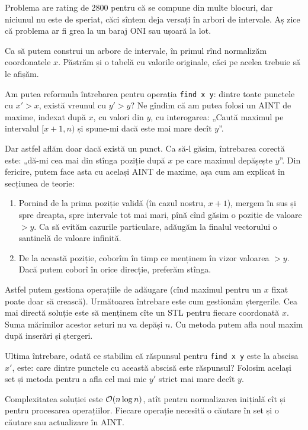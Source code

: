 \documentclass[../main.tex]{subfiles}
\begin{document}
Problema are rating de 2800 pentru că se compune din multe blocuri, dar niciunul nu este de speriat, căci sîntem deja versați în arbori de intervale.  Aș zice că problema ar fi grea la un baraj ONI sau ușoară la lot.

Ca să putem construi un arbore de intervale, în primul rînd normalizăm coordonatele $x$. Păstrăm și o tabelă cu valorile originale, căci pe acelea trebuie să le afișăm.

Am putea reformula întrebarea pentru operația \texttt{find x y}: dintre toate punctele cu $x'>x$, există vreunul cu $y' > y$? Ne gîndim că am putea folosi un AINT de maxime, indexat după $x$, cu valori din $y$, cu interogarea: „Caută maximul pe intervalul $[x + 1, n)$ și spune-mi dacă este mai mare decît $y$”.

Dar astfel aflăm doar dacă există un punct. Ca să-l găsim, întrebarea corectă este: „dă-mi cea mai din stînga poziție după $x$ pe care maximul depășește $y$”. Din fericire, putem face asta cu același AINT de maxime, așa cum am explicat în secțiunea de teorie:

\begin{enumerate}
  \item Pornind de la prima poziție validă (în cazul nostru, $x+1$), mergem în sus și spre dreapta, spre intervale tot mai mari, pînă cînd găsim o poziție de valoare $> y$. Ca să evităm cazurile particulare, adăugăm la finalul vectorului o santinelă de valoare infinită.

  \item De la această poziție, coborîm în timp ce menținem în vizor valoarea $> y$. Dacă putem coborî în orice direcție, preferăm stînga.
\end{enumerate}

Astfel putem gestiona operațiile de adăugare (cînd maximul pentru un $x$ fixat poate doar să crească). Următoarea întrebare este cum gestionăm ștergerile. Cea mai directă soluție este să menținem cîte un  STL pentru fiecare coordonată $x$. Suma mărimilor acestor seturi nu va depăși $n$. Cu metoda  putem afla noul maxim după inserări și ștergeri.

Ultima întrebare, odată ce stabilim că răspunsul pentru \texttt{find x y} este la abscisa $x'$, este: care dintre punctele cu această abscisă este răspunsul? Folosim același set și metoda  pentru a afla cel mai mic $y'$ strict mai mare decît $y$.

Complexitatea soluției este $\mathcal{O}(n \log n)$, atît pentru normalizarea inițială cît și pentru procesarea operațiilor. Fiecare operație necesită o căutare în set și o căutare sau actualizare în AINT.
\end{document}
